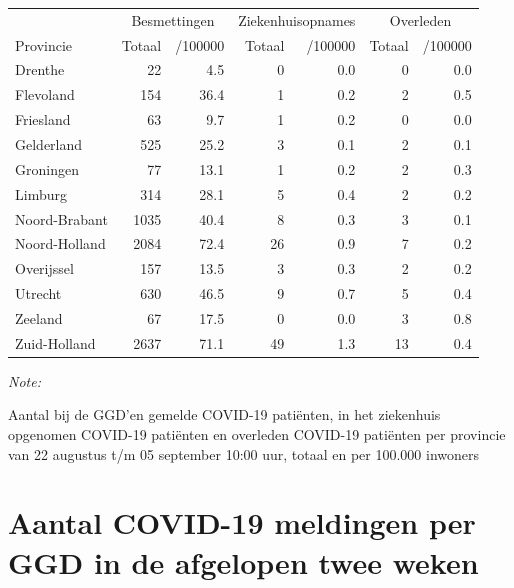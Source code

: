 \documentclass[
  english,
  man,floatsintext]{apa6}
\begin{document}
\begin{table}[H]
\centering
\begin{threeparttable}
\begin{tabular}{lrrrrrr}
\toprule
\multicolumn{1}{c}{ } & \multicolumn{2}{c}{Besmettingen} & \multicolumn{2}{c}{Ziekenhuisopnames} & \multicolumn{2}{c}{Overleden} \\
\cmidrule(l{3pt}r{3pt}){2-3} \cmidrule(l{3pt}r{3pt}){4-5} \cmidrule(l{3pt}r{3pt}){6-7}
Provincie & Totaal & /100000 & Totaal & /100000 & Totaal & /100000\\
\midrule
Drenthe & 22 & 4.5 & 0 & 0.0 & 0 & 0.0\\
Flevoland & 154 & 36.4 & 1 & 0.2 & 2 & 0.5\\
Friesland & 63 & 9.7 & 1 & 0.2 & 0 & 0.0\\
Gelderland & 525 & 25.2 & 3 & 0.1 & 2 & 0.1\\
Groningen & 77 & 13.1 & 1 & 0.2 & 2 & 0.3\\
Limburg & 314 & 28.1 & 5 & 0.4 & 2 & 0.2\\
Noord-Brabant & 1035 & 40.4 & 8 & 0.3 & 3 & 0.1\\
Noord-Holland & 2084 & 72.4 & 26 & 0.9 & 7 & 0.2\\
Overijssel & 157 & 13.5 & 3 & 0.3 & 2 & 0.2\\
Utrecht & 630 & 46.5 & 9 & 0.7 & 5 & 0.4\\
Zeeland & 67 & 17.5 & 0 & 0.0 & 3 & 0.8\\
Zuid-Holland & 2637 & 71.1 & 49 & 1.3 & 13 & 0.4\\
\bottomrule
\end{tabular}
\begin{tablenotes}
\item \textit{Note: } 
\item Aantal bij de GGD’en gemelde COVID-19 patiënten, in het ziekenhuis opgenomen COVID-19 patiënten en overleden COVID-19 patiënten per provincie van 22 augustus t/m 05 september 10:00 uur, totaal en per 100.000 inwoners
\end{tablenotes}
\end{threeparttable}
\end{table}

\newpage

\hypertarget{aantal-covid-19-meldingen-per-ggd-in-de-afgelopen-twee-weken}{%
\section{Aantal COVID-19 meldingen per GGD in de afgelopen twee weken}\label{aantal-covid-19-meldingen-per-ggd-in-de-afgelopen-twee-weken}}
\end{document}

